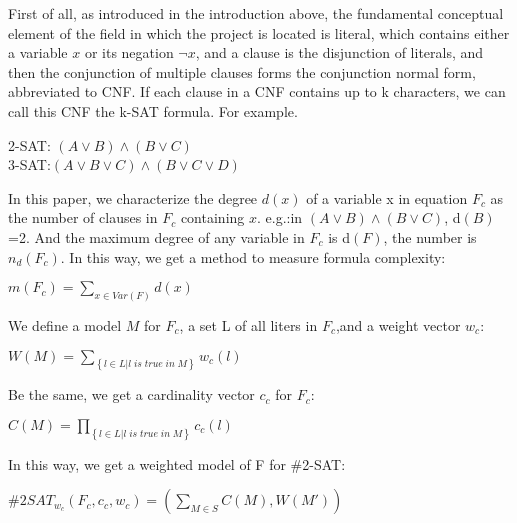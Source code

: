 \documentclass{sigchi}
\begin{document}
First of all, as introduced in the introduction above, the fundamental conceptual element of the field in which the project is located is literal, which contains either a variable $x$ or its negation $\neg x$, and a clause is the disjunction of literals, and then the conjunction of multiple clauses forms the conjunction normal form, abbreviated to CNF.\cite{10.1016/j.tcs.2004.10.037} If each clause in a CNF contains up to k characters, we can call this CNF the k-SAT formula. For example.
\begin{center}
	2-SAT:  $\left ( A \vee B \right )\wedge \left ( B \vee C \right ) $\\3-SAT:$\left ( A \vee B\vee C \right )\wedge \left ( B \vee C\vee D \right )$
\end{center}
In this paper, we characterize the degree $d \left( x \right)$ of a variable x in equation $F_{c}$ as the number of clauses in $F_{c}$ containing $x$.
e.g.:in $\left ( A \vee B \right )\wedge \left ( B \vee C \right ) $, d$\left( B \right)$=2.
And the maximum degree of  any variable in $F_{c}$ is d$\left(F\right)$, the number is $n_{d}\left ( F_{c} \right )$. In this way, we get a method to measure formula complexity:
\begin{center}
	$m\left(F_{c}\right)=\sum_{x\in Var\left(F\right)} d\left(x\right)$
	\cite{10.1016/j.tcs.2004.10.037}
\end{center}\cite{10.1016/j.tcs.2004.10.037}
We define a model $M$ for $F_{c}$, a set L of all liters in $F_{c}$,and a weight vector $w_{c}$:
\begin{center}
	$W\left ( M \right )=\sum_{\left \{ l\in L | l\;is\;true\;in\;M\right \}} w_{c}\left ( l \right )$
	\cite{10.1016/j.tcs.2004.10.037}
\end{center}
Be the same, we get a cardinality vector $c_{c}$ for $F_{c}$:
\begin{center}
	$C\left ( M \right )=\prod_{\left \{ l\in L | l\;is\;true\;in\;M\right \}} c_{c}\left ( l \right )$
	\cite{10.1016/j.tcs.2004.10.037}
\end{center}
In this way, we get a weighted model  of F for \#2-SAT:
\begin{center}
	$\#2SAT_{w_{c}}(F_{c}, c_{c}, w_{c})=\left ( \sum_{M\in S}C(M),W({M}') \right )$
	\cite{10.1016/j.tcs.2004.10.037}
\end{center}
\end{document}
